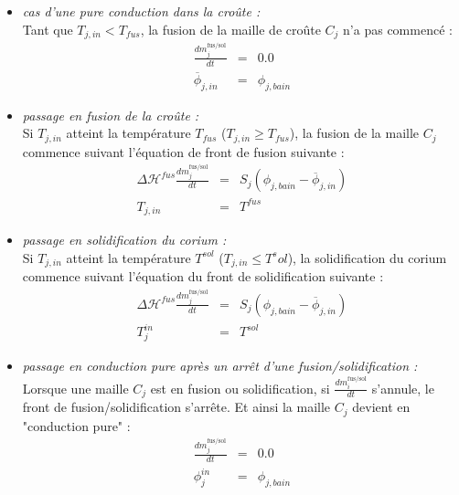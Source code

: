 \begin{itemize}
\item {\it cas d'une pure conduction dans la croûte :}\\
Tant que $T_{j,in}<T_{fus}$, la fusion de la maille de croûte $C_j$ n'a pas commencé :
\begin{eqnarray*}
\frac{dm_j^\text{fus/sol}}{dt} &=& 0.0 \\
\overline{\phi}_{j,in} &=& \phi_{j,bain}
\end{eqnarray*}

\item {\it passage en fusion de la croûte :}\\
Si $T_{j,in}$ atteint la température $T_{fus}$ ($T_{j,in}\ge T_{fus}$), la fusion de la maille $C_j$ commence suivant l'équation de front de fusion suivante :
\begin{eqnarray*}
\Delta \mathcal{H}^{fus} \frac{dm_j^\text{fus/sol}}{dt} &=& S_j\left(\phi_{j,bain} - \overline{\phi}_{j,in}\right) \\
T_{j,in} &=& T^{fus}
\end{eqnarray*}

\item {\it passage en solidification du corium :}\\
Si $T_{j,in}$ atteint la température $T^{sol}$ ($T_{j,in}\le T^sol$), la solidification du corium commence suivant l'équation du front de solidification suivante :
\begin{eqnarray*}
\Delta \mathcal{H}^{fus} \frac{dm_j^\text{fus/sol}}{dt} &=& S_j\left(\phi_{j,bain} - \overline{\phi}_{j,in}\right) \\
T_j^{in} &=& T^{sol}
\end{eqnarray*}

\item {\it passage en conduction pure après un arrêt d'une fusion/solidification :}\\
Lorsque une maille $C_j$ est en fusion ou solidification, si $\frac{dm_i^\text{fus/sol}}{dt}$ s'annule, le front de fusion/solidification s'arrête. Et ainsi la maille $C_j$ devient en "conduction pure" :
\begin{eqnarray*}
\frac{dm_j^\text{fus/sol}}{dt} &=& 0.0 \\
\phi_j^{in} &=& \phi_{j,bain}
\end{eqnarray*}
\end{itemize}

